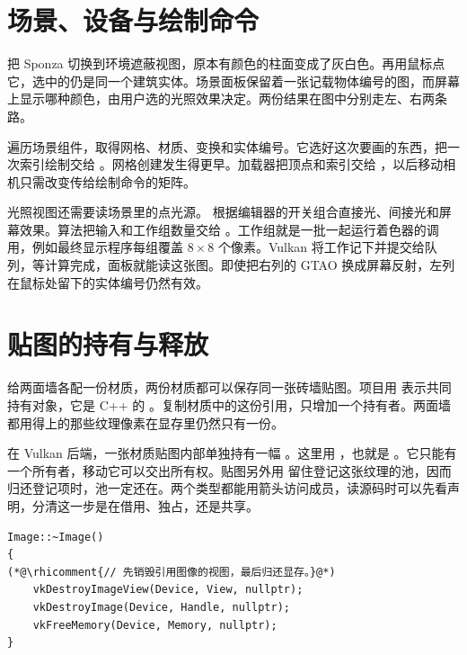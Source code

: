 \clearpage
\begingroup
\setlength{\parskip}{8pt}
\section{场景、设备与绘制命令}\label{sec:ownership}
把 Sponza 切换到环境遮蔽视图，原本有颜色的柱面变成了灰白色。再用鼠标点它，选中的仍是同一个建筑实体。场景面板保留着一张记载物体编号的图，而屏幕上显示哪种颜色，由用户选的光照效果决定。两份结果在图中分别走左、右两条路。


 遍历场景组件，取得网格、材质、变换和实体编号。它选好这次要画的东西，把一次索引绘制交给 。网格创建发生得更早。加载器把顶点和索引交给 ，以后移动相机只需改变传给绘制命令的矩阵。

光照视图还需要读场景里的点光源。 根据编辑器的开关组合直接光、间接光和屏幕效果。算法把输入和工作组数量交给 。工作组就是一批一起运行着色器的调用，例如最终显示程序每组覆盖 $8\times8$ 个像素。Vulkan 将工作记下并提交给队列，等计算完成，面板就能读这张图。即使把右列的 GTAO 换成屏幕反射，左列在鼠标处留下的实体编号仍然有效。

\clearpage
\section{贴图的持有与释放}\label{sec:ownership-texture}
给两面墙各配一份材质，两份材质都可以保存同一张砖墙贴图。项目用  表示共同持有对象，它是 C++ 的 。复制材质中的这份引用，只增加一个持有者。两面墙都用得上的那些纹理像素在显存里仍然只有一份。

在 Vulkan 后端，一张材质贴图内部单独持有一幅 。这里用 ，也就是 。它只能有一个所有者，移动它可以交出所有权。贴图另外用  留住登记这张纹理的池，因而归还登记项时，池一定还在。两个类型都能用箭头访问成员，读源码时可以先看声明，分清这一步是在借用、独占，还是共享。
\begin{lstlisting}
Image::~Image()
{
(*@\rhicomment{// 先销毁引用图像的视图，最后归还显存。}@*)
    vkDestroyImageView(Device, View, nullptr);
    vkDestroyImage(Device, Handle, nullptr);
    vkFreeMemory(Device, Memory, nullptr);
}
\end{lstlisting}

